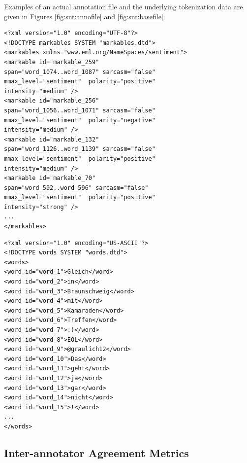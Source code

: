 Examples of an actual annotation file and the underlying tokenization
data are given in Figures \ref{fig:snt:annofile} and
\ref{fig:snt:basefile}.

\begin{minipage}[t]{\textwidth}
  \begin{minipage}[t]{0.45\textwidth}
    \lstset{language=XML}
    \begin{lstlisting}
<?xml version="1.0" encoding="UTF-8"?>
<!DOCTYPE markables SYSTEM "markables.dtd">
<markables xmlns="www.eml.org/NameSpaces/sentiment">
<markable id="markable_259"
span="word_1074..word_1087" sarcasm="false"
mmax_level="sentiment"  polarity="positive"
intensity="medium" />
<markable id="markable_256"
span="word_1056..word_1071" sarcasm="false"
mmax_level="sentiment"  polarity="negative"
intensity="medium" />
<markable id="markable_132"
span="word_1126..word_1139" sarcasm="false"
mmax_level="sentiment"  polarity="positive"
intensity="medium" />
<markable id="markable_70"
span="word_592..word_596" sarcasm="false"
mmax_level="sentiment"  polarity="positive"
intensity="strong" />
...
</markables>
    \end{lstlisting}%
  \end{minipage}\hfill%
  \begin{minipage}[t]{0.45\textwidth}%
    \lstset{language=XML}
    \begin{lstlisting}[basicstyle=\tiny]
<?xml version="1.0" encoding="US-ASCII"?>
<!DOCTYPE words SYSTEM "words.dtd">
<words>
<word id="word_1">Gleich</word>
<word id="word_2">in</word>
<word id="word_3">Braunschweig</word>
<word id="word_4">mit</word>
<word id="word_5">Kamaraden</word>
<word id="word_6">Treffen</word>
<word id="word_7">:)</word>
<word id="word_8">EOL</word>
<word id="word_9">@graulich12</word>
<word id="word_10">Das</word>
<word id="word_11">geht</word>
<word id="word_12">ja</word>
<word id="word_13">gar</word>
<word id="word_14">nicht</word>
<word id="word_15">!</word>
...
</words>
    \end{lstlisting}%
  \end{minipage}
\end{minipage}

\subsection{Inter-annotator Agreement Metrics}\label{subsec:snt:iaa}

